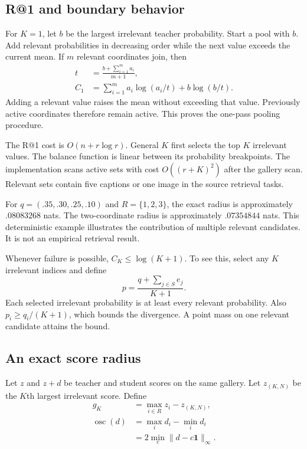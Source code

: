 \subsection{R@1 and boundary behavior}
For $K=1$, let $b$ be the largest irrelevant teacher probability.
Start a pool with $b$.
Add relevant probabilities in decreasing order while the next value exceeds the current mean.
If $m$ relevant coordinates join, then
\begin{align}
t&=\frac{b+\sum_{i=1}^m a_i}{m+1},\\
C_1&=\sum_{i=1}^m a_i\log(a_i/t)+b\log(b/t).
\end{align}
Adding a relevant value raises the mean without exceeding that value.
Previously active coordinates therefore remain active.
This proves the one-pass pooling procedure.

The R@1 cost is $O(n+r\log r)$.
General $K$ first selects the top $K$ irrelevant values.
The balance function is linear between its probability breakpoints.
The implementation scans active sets with cost $O((r+K)^2)$ after the gallery scan.
Relevant sets contain five captions or one image in the source retrieval tasks.

For $q=(.35,.30,.25,.10)$ and $R=\{1,2,3\}$, the exact radius is approximately $.08083268$ nats.
The two-coordinate radius is approximately $.07354844$ nats.
This deterministic example illustrates the contribution of multiple relevant candidates.
It is not an empirical retrieval result.

Whenever failure is possible, $C_K\leq\log(K+1)$.
To see this, select any $K$ irrelevant indices and define
\begin{equation}
p=\frac{q+\sum_{j\in S}e_j}{K+1}.
\end{equation}
Each selected irrelevant probability is at least every relevant probability.
Also $p_i\geq q_i/(K+1)$, which bounds the divergence.
A point mass on one relevant candidate attains the bound.

\subsection{An exact score radius}
Let $z$ and $z+d$ be teacher and student scores on the same gallery.
Let $z_{(K,N)}$ be the $K$th largest irrelevant score.
Define
\begin{align}
g_K&=\max_{i\in R}z_i-z_{(K,N)},\\
\operatorname{osc}(d)&=\max_i d_i-\min_i d_i\\
&=2\min_c\|d-c\mathbf1\|_\infty.\nonumber
\end{align}

